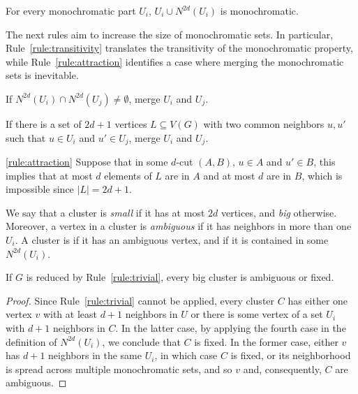 \begin{observation}
    For every monochromatic part $U_i$, $U_i \cup N^{2d}(U_i)$ is monochromatic.
\end{observation}

The next rules aim to increase the size of monochromatic sets.
In particular, Rule~\ref{rule:transitivity} translates the transitivity of the monochromatic property, while Rule~\ref{rule:attraction} identifies a case where merging the monochromatic sets is inevitable.

\begin{rrule}
    \label{rule:transitivity}
    If $N^{2d}(U_i) \cap N^{2d}(U_j) \neq \emptyset$, merge $U_i$ and $U_j$.
\end{rrule}

\begin{rrule}
    \label{rule:attraction}
    If there is a set of $2d+1$ vertices $L \subseteq V(G)$ with two common neighbors $u,u'$ such that $u \in U_i$ and $u' \in U_j$, merge $U_i$ and $U_j$.
\end{rrule}

\begin{sproof}{\ref{rule:attraction}}
    Suppose that in some $d$-cut $(A, B)$, $u \in A$ and $u' \in B$, this implies that at most $d$ elements of $L$ are in $A$ and at most $d$ are in $B$, which is impossible since $|L| = 2d+1$.
\end{sproof}

We say that a cluster is \textit{small} if it has at most $2d$ vertices, and \textit{big} otherwise.
Moreover, a vertex in a cluster is \textit{ambiguous} if it has neighbors in more than one $U_i$.
A cluster is  if it has an ambiguous vertex, and  if it is contained in some $N^{2d}(U_i)$.

\begin{observation}
    \label{obs:fix_amb}
    If $G$ is reduced by Rule~\ref{rule:trivial}, every big cluster is ambiguous or fixed.
\end{observation}

\begin{proof}
    Since Rule~\ref{rule:trivial} cannot be applied, every cluster $C$ has either one vertex $v$ with at least $d + 1$ neighbors in $U$ or there is some vertex of a set $U_i$ with $d + 1$ neighbors in $C$.
    In the latter case, by applying the fourth case in the definition of $N^{2d}(U_i)$, we conclude that $C$ is fixed.
    In the former case, either $v$ has $d+1$ neighbors in the same $U_i$, in which case $C$ is fixed, or its neighborhood is spread across multiple monochromatic sets, and so $v$ and, consequently, $C$ are ambiguous.
\end{proof}

